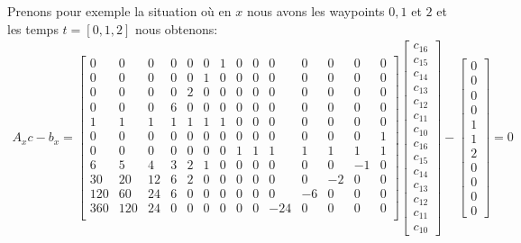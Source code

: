 Prenons pour exemple la situation où en $x$ nous avons les waypoints $0, 1$ et $2$ et les temps $t = [0, 1, 2]$ nous obtenons:
\setcounter{MaxMatrixCols}{20}
\begin{align*}
A_xc - b_x = \begin{bmatrix}
0 &  0 &  0 &  0 &  0 &  0 &  1 &  0 &  0 &  0 &  0 &  0 &  0 &  0\\
0 &  0 &  0 &  0 &  0 &  1 &  0 &  0 &  0 &  0 &  0 &  0 &  0 &  0\\
0 &  0 &  0 &  0 &  2 &  0 &  0 &  0 &  0 &  0 &  0 &  0 &  0 &  0\\
0 &  0 &  0 &  6 &  0 &  0 &  0 &  0 &  0 &  0 &  0 &  0 &  0 &  0\\
1 &  1 &  1 &  1 &  1 &  1 &  1 &  0 &  0 &  0 &  0 &  0 &  0 &  0\\
0 &  0 &  0 &  0 &  0 &  0 &  0 &  0 &  0 &  0 &  0 &  0 &  0 &  1\\
0 &  0 &  0 &  0 &  0 &  0 &  0 &  1 &  1 &  1 &  1 &  1 &  1 &  1\\
6 &  5 &  4 &  3 &  2 &  1 &  0 &  0 &  0 &  0 &  0 &  0 &  -1 &  0\\
30 &  20 &  12 &  6 &  2 &  0 &  0 &  0 &  0 &  0 &  0 &  -2 &  0 &  0\\
120 &  60 &  24 &  6 &  0 &  0 &  0 &  0 &  0 &  0 &  -6 &  0 &  0 &  0\\
360 &  120 &  24 &  0 &  0 &  0 &  0 &  0 &  0 &  -24 &  0 &  0 &  0 &  0\\
\end{bmatrix}\begin{bmatrix}
c_{16} \\ c_{15} \\ c_{14} \\ c_{13} \\ c_{12} \\ c_{11} \\ c_{10} \\ c_{16} \\ c_{15} \\ c_{14} \\ c_{13} \\ c_{12} \\ c_{11} \\ c_{10}
\end{bmatrix} -  \begin{bmatrix}
0 \\ 0 \\ 0 \\ 0 \\ 1 \\ 1 \\ 2 \\ 0 \\ 0 \\ 0 \\ 0
\end{bmatrix} = 0
\end{align*}

